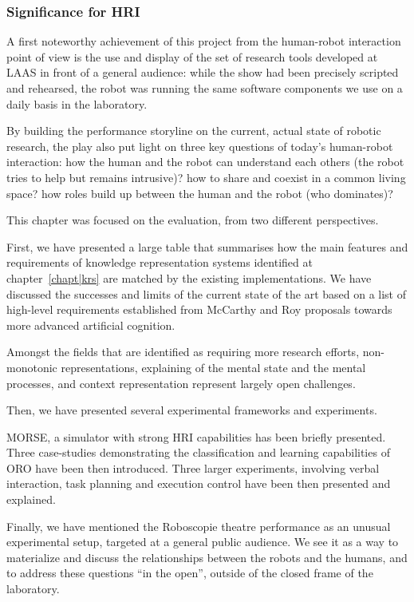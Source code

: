 \subsubsection{Significance for HRI}

A first noteworthy achievement of this project from the human-robot
interaction point of view is the use and display of the set of research tools
developed at LAAS in front of a general audience: while the show had been
precisely scripted and rehearsed, the robot was running the same software
components we use on a daily basis in the laboratory.

By building the performance storyline on the current, actual state of robotic
research,  the play also put light on three key questions of today's
human-robot interaction: how the human and the robot can understand each others
(the robot tries to help but remains intrusive)? how to share and coexist in a
common living space? how roles build up between the human and the robot (who
dominates)?

\recap

This chapter was focused on the evaluation, from two different perspectives.

First, we have presented a large table that summarises how the main features
and requirements of knowledge representation systems identified at
chapter~\ref{chapt|krs} are matched by the existing implementations. We have
discussed the successes and limits of the current state of the art based on a
list of high-level requirements established from McCarthy and Roy proposals
towards more advanced artificial cognition.

Amongst the fields that are identified as requiring more research efforts,
non-monotonic representations, explaining of the mental state and the mental
processes, and context representation represent largely open challenges.

Then, we have presented several experimental frameworks and experiments.

MORSE, a simulator with strong HRI capabilities has been briefly presented.
Three case-studies demonstrating the classification and learning capabilities
of ORO have been then introduced. Three larger experiments, involving verbal
interaction, task planning and execution control have been then presented and
explained.

Finally, we have mentioned the Roboscopie theatre performance as an unusual
experimental setup, targeted at a general public audience. We see it as a way
to materialize and discuss the relationships between the robots and the humans,
and to address these questions ``in the open'', outside of the closed frame of
the laboratory.



